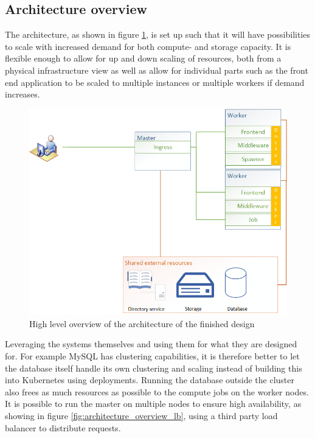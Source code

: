 \documentclass[../main.tex]{subfiles}
\begin{document}
\subsection{Architecture overview}
The architecture, as shown in figure \ref{fig:architecture_overview}, is set up such that it will have possibilities to scale with increased demand for both compute- and storage capacity. It is flexible enough to allow for up and down scaling of resources, both from a physical infrastructure view as well as allow for individual parts such as the front end application to be scaled to multiple instances or multiple workers if demand increases.
\begin{figure}[H]
    \centering
    \includegraphics[scale=.75]{img/architecture_overview.png}
    \caption{High level overview of the architecture of the finished design}
    \label{fig:architecture_overview}
\end{figure}
Leveraging the systems themselves and using them for what they are designed for. For example MySQL has clustering capabilities, it is therefore better to let the database itself handle its own clustering and scaling instead of building this into Kubernetes using deployments. Running the database outside the cluster also frees as much resources as possible to the compute jobs on the worker nodes.\\
It is possible to run the master on multiple nodes to ensure high availability, as showing in figure \ref{fig:architecture_overview_lb}, using a third party load balancer to distribute requests. \cite{kubernetes_ha}
\end{document}
